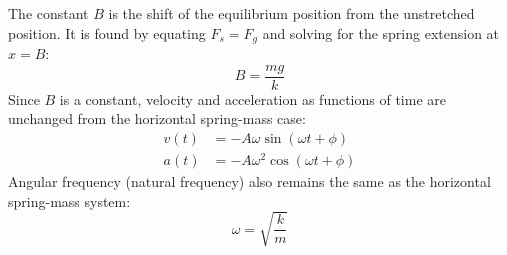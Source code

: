 
The constant $B$ is the shift of the equilibrium position from the unstretched
position. It is found by equating $F_s=F_g$ and solving for the spring extension
at $x=B$:
\begin{equation}
  B=\frac{mg}k
\end{equation}
Since $B$ is a constant, velocity and acceleration as functions of time are
unchanged from the horizontal spring-mass case:
\begin{align*}
  v(t) &= -A\omega\sin(\omega t+\phi)\\
  a(t) &= -A\omega^2\cos(\omega t+\phi)
\end{align*}
Angular frequency (natural frequency) also remains the same as the horizontal
spring-mass system:
\begin{equation*}
  \omega=\sqrt{\frac km}
\end{equation*}


